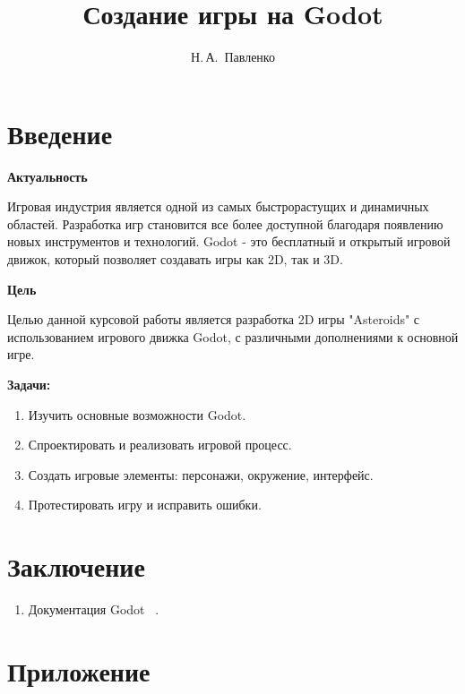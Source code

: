 \documentclass[14pt, oneside]{altsu-report}
\title{Создание игры на Godot}
\author{Н.\,А.~Павленко}
\institute{Институт цифровых технологий, электроники и физики}
\date{\the\year}
\begin{document}
\maketitle

\setcounter{page}{2}
\makeabstract
\tableofcontents

\chapter*{Введение}

\textbf{Актуальность}
    
Игровая индустрия является одной из самых быстрорастущих и динамичных областей. Разработка игр становится все более доступной благодаря появлению новых инструментов и технологий. Godot - это бесплатный и открытый игровой движок, который позволяет создавать игры как 2D, так и 3D.

\textbf{Цель}

Целью данной курсовой работы является разработка 2D игры "Asteroids" с использованием игрового движка Godot, с различными дополнениями к основной игре.

\textbf{Задачи:}

\begin{enumerate}
\item Изучить основные возможности Godot.
\item Спроектировать и реализовать игровой процесс.
\item Создать игровые элементы: персонажи, окружение, интерфейс.
\item Протестировать игру и исправить ошибки.
\end{enumerate}





\chapter*{Заключение}

\begin{enumerate}
\item Документация Godot ~\cite{https://docs.godotengine.org/en/stable/}.
\end{enumerate}

\newpage
{}
\printbibliography[title={Список использованной литературы}]

\appendix
\newpage
\chapter*{\raggedleft\label{appendix1}Приложение}
\end{document}
